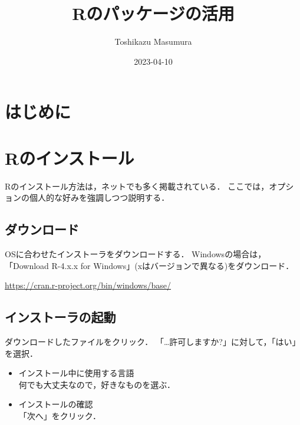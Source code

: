 \documentclass[
]{article}
\title{Rのパッケージの活用}
\author{Toshikazu Masumura}
\date{2023-04-10}
\providecommand{\tightlist}{%
  \setlength{\itemsep}{0pt}\setlength{\parskip}{0pt}}
\begin{document}
\maketitle

{
\setcounter{tocdepth}{2}
\tableofcontents
}
\hypertarget{ux306fux3058ux3081ux306b}{%
\section*{はじめに}\label{ux306fux3058ux3081ux306b}}

\hypertarget{install}{%
\section{Rのインストール}\label{install}}

Rのインストール方法は，ネットでも多く掲載されている．
ここでは，オプションの個人的な好みを強調しつつ説明する．

\hypertarget{ux30c0ux30a6ux30f3ux30edux30fcux30c9}{%
\subsection{ダウンロード}\label{ux30c0ux30a6ux30f3ux30edux30fcux30c9}}

OSに合わせたインストーラをダウンロードする．
Windowsの場合は，「Download R-4.x.x for Windows」(xはバージョンで異なる)をダウンロード．

\url{https://cran.r-project.org/bin/windows/base/}

\hypertarget{ux30a4ux30f3ux30b9ux30c8ux30fcux30e9ux306eux8d77ux52d5}{%
\subsection{インストーラの起動}\label{ux30a4ux30f3ux30b9ux30c8ux30fcux30e9ux306eux8d77ux52d5}}

ダウンロードしたファイルをクリック．
「\ldots 許可しますか?」に対して，「はい」を選択．

\begin{itemize}
\tightlist
\item
  インストール中に使用する言語\\
  何でも大丈夫なので，好きなものを選ぶ．
\end{itemize}

\begin{itemize}
\tightlist
\item
  インストールの確認\\
  「次へ」をクリック．
\end{itemize}
\end{document}
